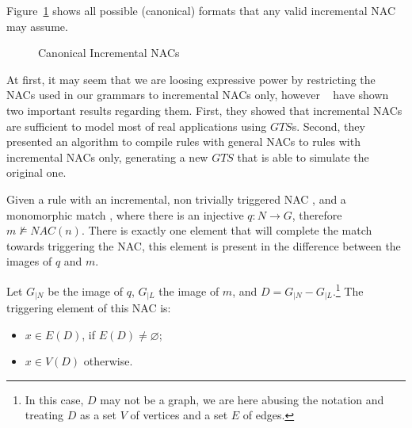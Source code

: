 \begin{example}Figure~\ref{fig:process:incremental-nacs} shows all possible (canonical) formats that any valid incremental NAC may assume.

\begin{figure}[!ht]
  \centering
  \caption{Canonical Incremental NACs}\label{fig:process:incremental-nacs}
\end{figure}
\end{example}

At first, it may seem that we are loosing expressive power by restricting the NACs used in our grammars to incremental NACs only, however ~\cite{Corradini2013} have shown two important results regarding them. First, they showed that incremental NACs are sufficient to model most of real applications using $GTS$s. Second, they presented an algorithm to compile rules with general NACs to rules with incremental NACs only, generating a new $GTS$ that is able to simulate the original one.

\begin{definition} Given a rule \graphrule{} with an incremental, non trivially triggered NAC \nac{}, and a monomorphic match \match{}, where there is an injective $q : N \rightarrow G$, therefore $m \not\models NAC(n)$. There is exactly one element that will complete the match towards triggering the NAC, this element is present in the difference between the images of $q$ and $m$.

  Let $G_{|N}$ be the image of $q$, $G_{|L}$ the image of $m$, and \mbox{$D = G_{|N} - G_{|L}$}.\footnote{In this case, $D$ may not be a graph, we are here abusing the notation and treating $D$ as a set $V$ of vertices and a set $E$ of edges.} The triggering element of this NAC is:

  \begin{itemize}
    \item $x \in E(D)$, if $E(D) \neq \varnothing$;
    \item $x \in V(D)$ otherwise.
  \end{itemize} 
\end{definition}

